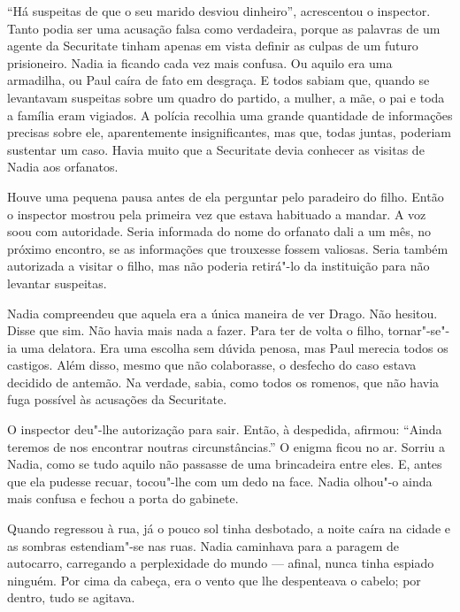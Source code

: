 ``Há suspeitas de que o seu marido desviou dinheiro'',
acrescentou o inspector. Tanto podia ser uma acusação falsa como
verdadeira, porque as palavras de um agente da Securitate tinham apenas
em vista definir as culpas de um futuro prisioneiro. Nadia ia ficando
cada vez mais confusa. Ou aquilo era uma armadilha, ou Paul caíra de
fato em desgraça. E todos sabiam que, quando se levantavam suspeitas
sobre um quadro do partido, a mulher, a
mãe, o pai e toda a família eram vigiados. A polícia recolhia uma
grande quantidade de informações precisas sobre ele, aparentemente
insignificantes, mas que, todas juntas, poderiam sustentar um caso.
Havia muito que a Securitate devia conhecer as visitas de Nadia aos
orfanatos.

Houve uma pequena pausa antes de ela perguntar pelo paradeiro do filho.
Então o inspector mostrou pela primeira vez que estava habituado a
mandar. A voz soou com autoridade. Seria informada do nome do orfanato
dali a um mês, no próximo encontro, se as informações que trouxesse
fossem valiosas. Seria também autorizada a visitar o filho, mas não
poderia retirá"-lo da instituição para não levantar suspeitas.

Nadia compreendeu que aquela era a única maneira de ver Drago. Não
hesitou. Disse que sim. Não havia mais nada a fazer. Para ter de volta o
filho, tornar"-se"-ia uma delatora. Era uma escolha sem dúvida penosa, mas
Paul merecia todos os castigos. Além disso, mesmo que não colaborasse, o
desfecho do caso estava decidido de antemão. Na verdade, sabia, como
todos os romenos, que não havia fuga possível às acusações da
Securitate.

O inspector deu"-lhe autorização para sair. Então, à despedida,
afirmou: ``Ainda teremos de nos encontrar noutras circunstâncias.'' O
enigma ficou no ar. Sorriu a Nadia, como se tudo aquilo não passasse de
uma brincadeira entre eles. E, antes que ela pudesse recuar, tocou"-lhe
com um dedo na face. Nadia olhou"-o ainda mais confusa e fechou a porta
do gabinete.

Quando regressou à rua, já o pouco sol tinha desbotado, a noite caíra
na cidade e as sombras estendiam"-se nas
ruas. Nadia caminhava para a paragem de autocarro, carregando a
perplexidade do mundo --- afinal, nunca tinha espiado ninguém. Por cima
da cabeça, era o vento que lhe despenteava o cabelo; por dentro, tudo se
agitava.

